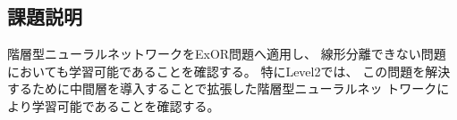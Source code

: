 \subsection{課題説明}
階層型ニューラルネットワークをExOR問題へ適用し、
線形分離できない問題においても学習可能であることを確認する。
特にLevel2では、
この問題を解決するために中間層を導入することで拡張した階層型ニューラルネッ
トワークにより学習可能であることを確認する。



